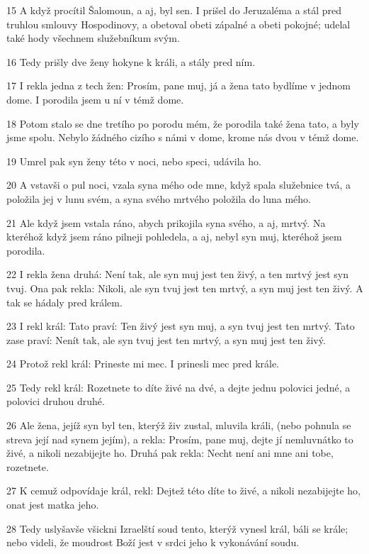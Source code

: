 \par 15 A když procítil Šalomoun, a aj, byl sen. I prišel do Jeruzaléma a stál pred truhlou smlouvy Hospodinovy, a obetoval obeti zápalné a obeti pokojné; udelal také hody všechnem služebníkum svým.
\par 16 Tedy prišly dve ženy hokyne k králi, a stály pred ním.
\par 17 I rekla jedna z tech žen: Prosím, pane muj, já a žena tato bydlíme v jednom dome. I porodila jsem u ní v témž dome.
\par 18 Potom stalo se dne tretího po porodu mém, že porodila také žena tato, a byly jsme spolu. Nebylo žádného cizího s námi v dome, krome nás dvou v témž dome.
\par 19 Umrel pak syn ženy této v noci, nebo speci, udávila ho.
\par 20 A vstavši o pul noci, vzala syna mého ode mne, když spala služebnice tvá, a položila jej v lunu svém, a syna svého mrtvého položila do luna mého.
\par 21 Ale když jsem vstala ráno, abych prikojila syna svého, a aj, mrtvý. Na kteréhož když jsem ráno pilneji pohledela, a aj, nebyl syn muj, kteréhož jsem porodila.
\par 22 I rekla žena druhá: Není tak, ale syn muj jest ten živý, a ten mrtvý jest syn tvuj. Ona pak rekla: Nikoli, ale syn tvuj jest ten mrtvý, a syn muj jest ten živý. A tak se hádaly pred králem.
\par 23 I rekl král: Tato praví: Ten živý jest syn muj, a syn tvuj jest ten mrtvý. Tato zase praví: Nenít tak, ale syn tvuj jest ten mrtvý, a syn muj jest ten živý.
\par 24 Protož rekl král: Prineste mi mec. I prinesli mec pred krále.
\par 25 Tedy rekl král: Rozetnete to díte živé na dvé, a dejte jednu polovici jedné, a polovici druhou druhé.
\par 26 Ale žena, jejíž syn byl ten, kterýž živ zustal, mluvila králi, (nebo pohnula se streva její nad synem jejím), a rekla: Prosím, pane muj, dejte jí nemluvnátko to živé, a nikoli nezabijejte ho. Druhá pak rekla: Necht není ani mne ani tobe, rozetnete.
\par 27 K cemuž odpovídaje král, rekl: Dejtež této díte to živé, a nikoli nezabijejte ho, onat jest matka jeho.
\par 28 Tedy uslyšavše všickni Izraelští soud tento, kterýž vynesl král, báli se krále; nebo videli, že moudrost Boží jest v srdci jeho k vykonávání soudu.

